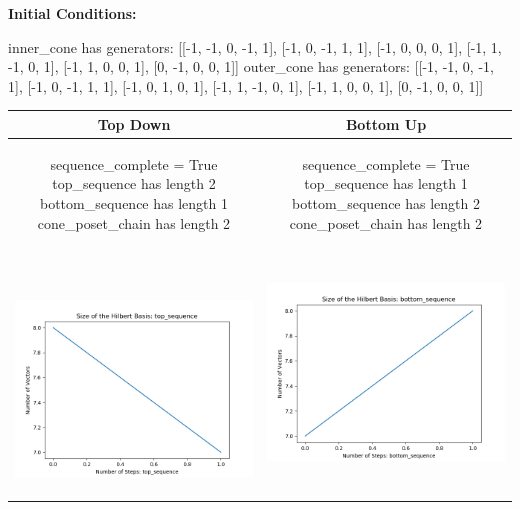 \documentclass[10pt]{article}
\begin{document}
\textbf{Initial Conditions:}
\begin{SAGE}
inner_cone has generators: 
[[-1, -1, 0, -1, 1], [-1, 0, -1, 1, 1], [-1, 0, 0, 0, 1], [-1, 1, -1, 0, 1], [-1, 1, 0, 0, 1], [0, -1, 0, 0, 1]]
outer_cone has generators: 
[[-1, -1, 0, -1, 1], [-1, 0, -1, 1, 1], [-1, 0, 1, 0, 1], [-1, 1, -1, 0, 1], [-1, 1, 0, 0, 1], [0, -1, 0, 0, 1]]

\end{SAGE}
\begin{tabular}{c|c}
\textbf{Top Down} & \textbf{Bottom Up} \\ \hline  
\begin{SAGE}
	sequence_complete = True
	top_sequence has length 2
	bottom_sequence has length 1
	cone_poset_chain has length 2
\end{SAGE} 
&
\begin{SAGE}
	sequence_complete = True
	top_sequence has length 1
	bottom_sequence has length 2
	cone_poset_chain has length 2
\end{SAGE} 
\\ \hline
\
\begin{minipage}{.45\textwidth}
\includegraphics[width=\textwidth]{"DATA/5d/6 generators 1 bound H/top_sequence SIZE"}
\end{minipage} &
\begin{minipage}{.45\textwidth}
\includegraphics[width=\textwidth]{"DATA/5d/6 generators 1 bound H bottomup/bottom_sequence SIZE"}

\end{minipage}
\end{tabular}
\end{document}
